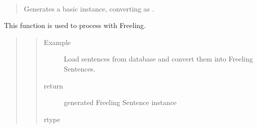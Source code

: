 \documentclass[letterpaper,10pt,english]{sphinxmanual}
\begin{document}
\begin{fulllineitems}
\begin{quote}
\begin{description}
\begin{itemize}
\end{itemize}

\end{description}\end{quote}

\begin{fulllineitems}
\label{\detokenize{classes:loacore.classes.classes.Sentence.compute_freeling_sentence}}~\begin{quote}

Generates a basic  instance, converting  as  .
\end{quote}

This function is used to process {\hyperref[\detokenize{classes:loacore.classes.classes.Sentence}]{}} with Freeling.
\begin{quote}
\begin{quote}\begin{description}
\item[{Example}] \leavevmode
Load sentences from database and convert them into Freeling Sentences.

%
\begin{sphinxVerbatim}[commandchars=\\\{\}]
   
  
  \PYG{p}{[}    \PYG{p}{]}
\end{sphinxVerbatim}

\item[{return}] \leavevmode
generated Freeling Sentence instance

\item[{rtype}] \leavevmode
{}


\end{description}
\end{quote}
\end{quote}
\end{fulllineitems}
\end{fulllineitems}
\end{document}

